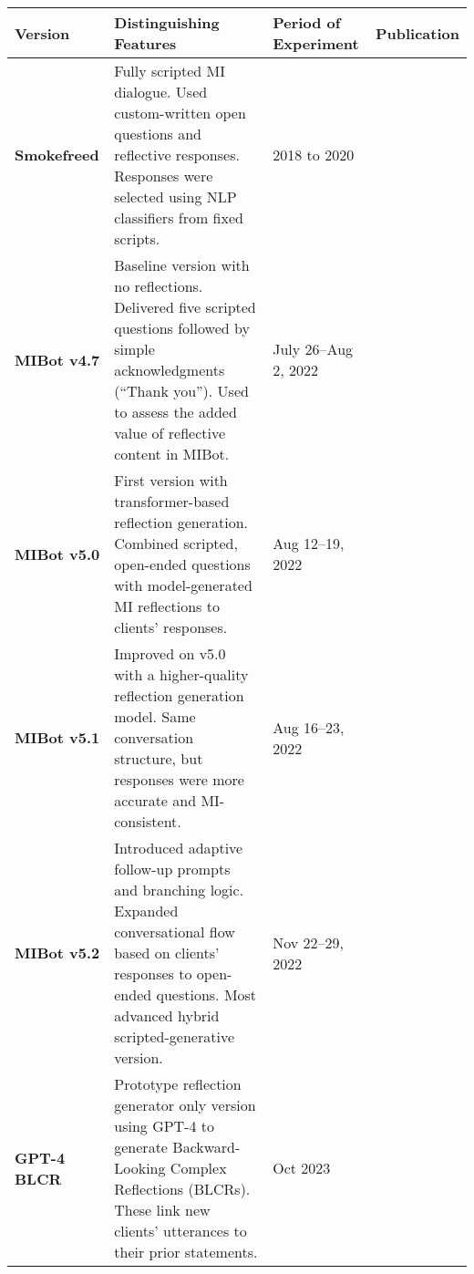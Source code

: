\begin{table}[!h]
        \small
        \centering
        \begingroup
        \setlength{\tabcolsep}{4pt}
        \begin{tabularx}{\textwidth}{@{}>{\raggedright\arraybackslash}p{}YYY@{}}
		\toprule
		\textbf{Version}     & \textbf{Distinguishing Features}                                                                                                                                                               & \textbf{Period of Experiment}   & \textbf{Publication}     \\
		\midrule
		\textbf{Smokefreed}  & Fully scripted MI dialogue. Used custom-written open ques\-tions and reflective responses. Responses were selected using NLP classifiers from fixed scripts.                                     & 2018 to 2020                    & \citet{Almusharraf_2019} \\
		\hline
		\textbf{MIBot v4.7}  & Baseline version with no reflections. Delivered five scripted questions followed by simple acknowledgments (``Thank you''). Used to assess the added value of reflective content in MIBot.     & July 26–Aug 2, 2022             & \citet{brown2023mi}      \\
		\hline
		\textbf{MIBot v5.0}  & First version with transformer-based reflection generation. Combined scripted, open-ended questions with model-generated MI reflections to clients' responses.                                 & Aug 12–19, 2022                 & \citet{brown2023mi}      \\
		\hline
		\textbf{MIBot v5.1}  & Improved on v5.0 with a higher-quality reflection generation model. Same conversation structure, but responses were more accurate and MI-consistent.                                           & Aug 16–23, 2022                 & \citet{brown2023mi}      \\
		\hline
		\textbf{MIBot v5.2}  & Introduced adaptive follow-up prompts and branching logic. Expanded conversational flow based on clients' responses to open-ended questions. Most advanced hybrid scripted-generative version. & Nov 22–29, 2022                 & \citet{brown2023mi}      \\
		\hline
		\textbf{GPT-4 BLCR}  & Prototype reflection generator only version using GPT-4 to generate Backward-Looking Complex Reflections (BLCRs). These link new clients' utterances to their prior statements.
		                     & Oct 2023
		                     & \citet{brown2023mi}                                                                                                                                                                                                                                         \\

\end{tabularx}
\end{table}
